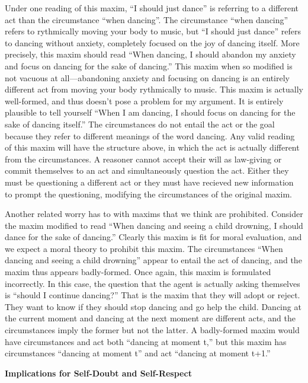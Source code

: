 \begin{isabellebody}
\begin{isamarkuptext}
Under one reading of this maxim, ``I should just dance'' is referring to a different act than the 
circumstance ``when dancing''. The circumstance ``when dancing'' refers 
to rythmically moving your body to music, but ``I should just dance'' refers to dancing without anxiety, 
completely focused on the joy of dancing itself. More precisely, this maxim should read ``When 
dancing, I should abandon my anxiety and focus on dancing for the sake of dancing.'' This maxim when so 
modified is not vacuous at all—abandoning anxiety and focusing on dancing is an entirely different act 
from moving your body rythmically to music. This maxim is actually well-formed, and thus doesn't
pose a problem for my argument. It is entirely plausible to tell yourself ``When I am dancing, I should focus 
on dancing for the sake of dancing itself.'' The circumstances do not entail the act or the goal because 
they refer to different meanings of the word dancing. Any valid reading of this maxim will have the structure above, 
in which the act is actually different from the circumstances. A reasoner cannot accept their will 
as law-giving or commit themselves to an act and simultaneously question the act. Either they must be 
questioning a different act or they must have recieved new information to prompt the questioning, 
modifying the circumstances of the original maxim. 

Another related worry has to with maxims that we think are prohibited. Consider the maxim modified to 
read ``When dancing and seeing a child drowning, I should dance for the sake of dancing.'' Clearly this 
maxim is fit for moral evaluation, and we expect a moral theory to prohibit this maxim. The circumstances 
``When dancing and seeing a child drowning'' appear to entail the act of dancing, and the maxim thus 
appears badly-formed. Once again, this maxim is formulated incorrectly. In this case, the question 
that the agent is actually asking themselves is ``should I continue dancing?'' That is the 
maxim that they will adopt or reject. They want to know if they should stop dancing and go help the child. 
Dancing at the current moment and dancing at the next moment are different acts, and the circumstances 
imply the former but not the latter. A badly-formed maxim would have circumstances and act both 
``dancing at moment t,'' but this maxim has circumstances ``dancing at moment t'' and act ``dancing 
at moment t+1.''

\noindent \textbf{Implications for Self-Doubt and Self-Respect}


\end{isamarkuptext}
\end{isabellebody}
